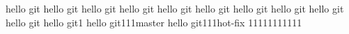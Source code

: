 hello git
hello git
hello git
hello git
hello git
hello git
hello git
hello git
hello git
hello git
hello git1
hello git111master
hello git111hot-fix
11111111111
